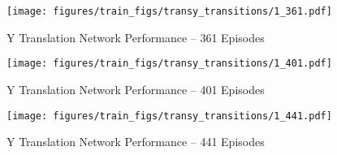 \begin{figure}[H]
	\centering
	\texttt{[image: figures/train\_figs/transy\_transitions/1\_361.pdf]}
	\caption{Y Translation Network Performance -- 361 Episodes}
\end{figure}
\begin{figure}[H]
	\centering
	\texttt{[image: figures/train\_figs/transy\_transitions/1\_401.pdf]}
	\caption{Y Translation Network Performance -- 401 Episodes}
\end{figure}
\begin{figure}[H]
	\centering
	\texttt{[image: figures/train\_figs/transy\_transitions/1\_441.pdf]}
	\caption{Y Translation Network Performance -- 441 Episodes}
\end{figure}
